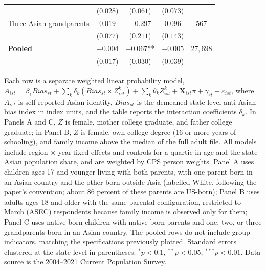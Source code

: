 \begin{table}[H]
{\begin{threeparttable}
\begin{tabular}{lcccc}
 & ($0.028$) & ($0.061$) & ($0.073$) & \\
Three Asian grandparents & $0.019$ & $-0.297$ & $0.096$ & $567$ \\
 & ($0.077$) & ($0.211$) & ($0.143$) & \\
\textbf{Pooled} & $-0.004$ & $-0.067$** & $-0.005$ & $27{,}698$ \\
 & ($0.017$) & ($0.030$) & ($0.039$) & \\
\bottomrule
\end{tabular}
\begin{tablenotes}
\small
\item[1] \footnotesize{Each row is a separate weighted linear probability model, $A_{ist} = \beta_1 Bias_{st} + \sum_k \delta_k (Bias_{st} \times Z_{ist}^k) + \sum_k \theta_k Z_{ist}^k + \mathbf{X}_{ist}\pi + \gamma_{rt} + \varepsilon_{ist}$, where $A_{ist}$ is self-reported Asian identity, $Bias_{st}$ is the demeaned state-level anti-Asian bias index in index units, and the table reports the interaction coefficients $\delta_k$. In Panels A and C, $Z$ is female, mother college graduate, and father college graduate; in Panel B, $Z$ is female, own college degree (16 or more years of schooling), and family income above the median of the full adult file. All models include region $\times$ year fixed effects and controls for a quartic in age and the state Asian population share, and are weighted by CPS person weights. Panel A uses children ages 17 and younger living with both parents, with one parent born in an Asian country and the other born outside Asia (labelled White, following the paper's convention; about 86 percent of these parents are US-born); Panel B uses adults ages 18 and older with the same parental configuration, restricted to March (ASEC) respondents because family income is observed only for them; Panel C uses native-born children with native-born parents and one, two, or three grandparents born in an Asian country. The pooled rows do not include group indicators, matching the specifications previously plotted. Standard errors clustered at the state level in parentheses. $^{*}p<0.1$, $^{**}p<0.05$, $^{***}p<0.01$. Data source is the 2004--2021 Current Population Survey.}
\end{tablenotes}
\end{threeparttable}}
\end{table}
